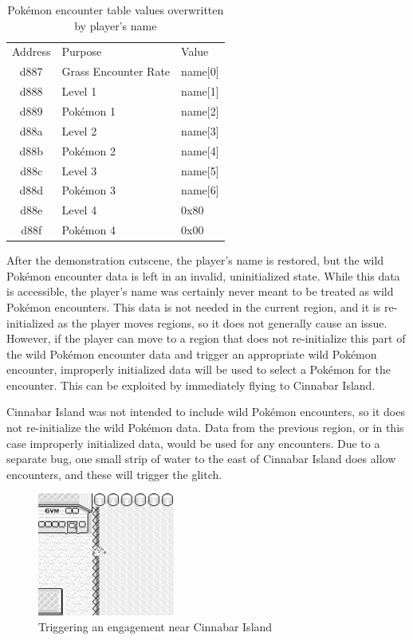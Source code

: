 \documentclass[letterpaper]{article}
\begin{document}
\begin{table}[h!]
\centering
\begin{tabular}{cll}
Address &              Purpose &   Value \\
   d887 & Grass Encounter Rate & name[0] \\
   d888 &              Level 1 & name[1] \\
   d889 &            Pokémon 1 & name[2] \\
   d88a &              Level 2 & name[3] \\
   d88b &            Pokémon 2 & name[4] \\
   d88c &              Level 3 & name[5] \\
   d88d &            Pokémon 3 & name[6] \\
   d88e &              Level 4 &    0x80 \\
   d88f &            Pokémon 4 &    0x00 \\
\end{tabular}
\caption{Pokémon encounter table values overwritten by player's name}
\end{table}

After the demonstration cutscene, the player's name is restored, but the wild Pokémon encounter data is left in an invalid, uninitialized state. While this data is accessible, the player's name was certainly never meant to be treated as wild Pokémon encounters. This data is not needed in the current region, and it is re-initialized as the player moves regions, so it does not generally cause an issue. However, if the player can move to a region that does not re-initialize this part of the wild Pokémon encounter data and trigger an appropriate wild Pokémon encounter, improperly initialized data will be used to select a Pokémon for the encounter. This can be exploited by immediately flying to Cinnabar Island.

Cinnabar Island was not intended to include wild Pokémon encounters, so it does not re-initialize the wild Pokémon data. Data from the previous region, or in this case improperly initialized data, would be used for any encounters. Due to a separate bug, one small strip of water to the east of Cinnabar Island does allow encounters, and these will trigger the glitch.

\begin{figure}[h!]
    \centering
    \includegraphics[width=0.4\textwidth]{surfing.png}
    \caption{Triggering an engagement near Cinnabar Island}
\end{figure}
\end{document}
